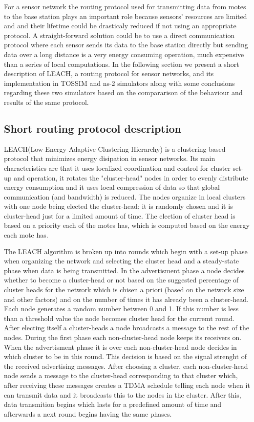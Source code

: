 For a sensor network the routing protocol used for transmitting data from motes to
the base station plays an important role because sensors' resources are limited and 
and their lifetime could be drasticaly reduced if not using an appropriate protocol.
A straight-forward solution could be to use a direct communication protocol where
each sensor sends its data to the base station directly but sending data over a 
long distance is a very energy consuming operation, much expensive than a series
of local computations.
In the following section we present a short description of LEACH, a routing protocol for sensor networks, and
its implementation in TOSSIM and ns-2 simulators along with some conclusions regarding 
these two simulators based on the compararison of the behaviour and results of the same protocol.  


\subsection{ Short routing protocol description}
LEACH\cite{leach-desc}(Low-Energy Adaptive Clustering Hierarchy) is a clustering-based protocol
that minimizes energy disipation in sensor networks. Its main characteristics are that
it uses localized coordination and control for cluster set-up and operation, it
rotates the "cluster-head" nodes in order to evenly distribute energy consumption and
it uses local compression of data so that global communication (and bandwidth)
is reduced.
The nodes organize in local clusters with one node being elected the cluster-head; it is randomly chosen
and it is cluster-head just for a limited amount of time. The election of cluster head
is based on a priority each of the motes has, which is computed based on the energy
each mote has.

The LEACH algorithm is broken up into rounds which begin with a set-up phase when organizing the 
network and selecting the cluster head and a steady-state phase when data is being transmitted.
In the advertisment phase a node decides whether to become a cluster-head or not based
on the suggested percentage of cluster heads for the network which is chisen a priori (based
on the network size and other factors) and on the number of times it has already been a cluster-head. 
Each node generates a random number between 0 and 1. If this number is less than a threshold value the node becomes cluster
head for the curremt round. After electing itself a cluster-heads  a node broadcasts a 
message to the rest of the nodes. During the first phase each non-cluster-head node keeps its receivers on.
When the advertisment phase it is over each non-cluster-head node decides in which
cluster to be in this round. This decision is based on the signal strenght of the received advertising
messages.
After choosing a cluster, each non-cluster-head node sends a message
to the cluster-head corresponding to that cluster which, after receiving these messages
creates a TDMA\cite{tdma} schedule telling each node when it can transmit data and it broadcasts
this to the nodes in the cluster.
After this, data transmition begins which lasts for a predefined amount of time and afterwards a next
round begins having the same phases.

